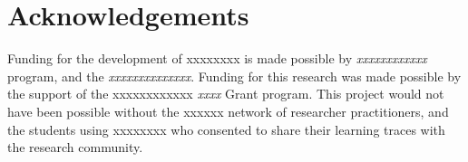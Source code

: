 \documentclass[runningheads]{llncs}
\begin{document}
\section{Acknowledgements}
Funding for the development of xxxxxxxx is made possible by 
\textit{xxxxxxxxxxxx} program, and the \textit{xxxxxxxxxxxxxx}. Funding for 
this research was made possible by the support of the xxxxxxxxxxxx 
\textit{xxxx} Grant program. This project would not have been possible 
without the xxxxxx network of researcher practitioners, and the students using 
xxxxxxxx who consented to share their learning traces with the research 
community.

 
 
\end{document}
